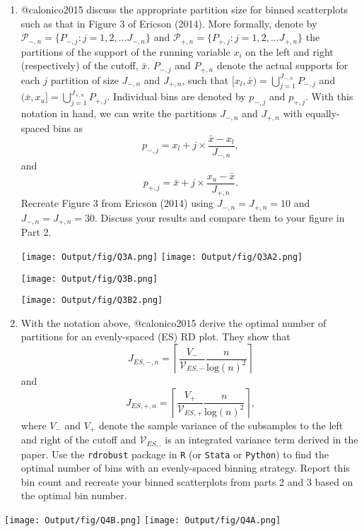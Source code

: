 \documentclass[
  12pt,
]{article}
\begin{document}
\begin{enumerate}
\def\labelenumi{\arabic{enumi}.}
\setcounter{enumi}{2}
\item
  @calonico2015 discuss the appropriate partition size for binned
  scatterplots such as that in Figure 3 of Ericson (2014). More
  formally, denote by
  \(\mathcal{P}_{-,n} = \{ P_{-,j} : j=1, 2, ... J_{-, n} \}\) and
  \(\mathcal{P}_{+,n} = \{ P_{+,j} : j=1, 2, ... J_{+, n} \}\) the
  partitions of the support of the running variable \(x_{i}\) on the
  left and right (respectively) of the cutoff, \(\bar{x}\). \(P_{-, j}\)
  and \(P_{+, n}\) denote the actual supports for each \(j\) partition
  of size \(J_{-,n}\) and \(J_{+,n}\), such that
  \([x_{l}, \bar{x}) = \bigcup_{j=1}^{J_{-,n}} P_{-, j}\) and
  \((\bar{x}, x_{u}] = \bigcup_{j=1}^{J_{+,n}} P_{+, j}\). Individual
  bins are denoted by \(p_{-,j}\) and \(p_{+,j}\). With this notation in
  hand, we can write the partitions \(J_{-,n}\) and \(J_{+,n}\) with
  equally-spaced bins as
  \[p_{-,j}=x_{l} + j \times \frac{\bar{x} - x_{l}}{J_{-,n}},\] and
  \[p_{+,j} = \bar{x} + j \times \frac{x_{u} - \bar{x}}{J_{+,n}}.\]
  Recreate Figure 3 from Ericson (2014) using \(J_{-,n}=J_{+,n}=10\) and
  \(J_{-,n}=J_{+,n}=30\). Discuss your results and compare them to your
  figure in Part 2.

  \texttt{[image: Output/fig/Q3A.png]}
  \texttt{[image: Output/fig/Q3A2.png]}

  \texttt{[image: Output/fig/Q3B.png]}

  \texttt{[image: Output/fig/Q3B2.png]}
\item
  With the notation above, @calonico2015 derive the optimal number of
  partitions for an evenly-spaced (ES) RD plot. They show that
  \[J_{ES,-,n} = \left\lceil \frac{V_{-}}{\mathcal{V}_{ES,-}} \frac{n}{\text{log}(n)^{2}} \right\rceil\]
  and
  \[J_{ES,+,n} = \left\lceil \frac{V_{+}}{\mathcal{V}_{ES,+}} \frac{n}{\text{log}(n)^{2}} \right\rceil,\]
  where \(V_{-}\) and \(V_{+}\) denote the sample variance of the
  subsamples to the left and right of the cutoff and
  \(\mathcal{V}_{ES,.}\) is an integrated variance term derived in the
  paper. Use the \texttt{rdrobust} package in \texttt{R} (or
  \texttt{Stata} or \texttt{Python}) to find the optimal number of bins
  with an evenly-spaced binning strategy. Report this bin count and
  recreate your binned scatterplots from parts 2 and 3 based on the
  optimal bin number.
\end{enumerate}

\texttt{[image: Output/fig/Q4B.png]}
\texttt{[image: Output/fig/Q4A.png]} \pagebreak
\end{document}
